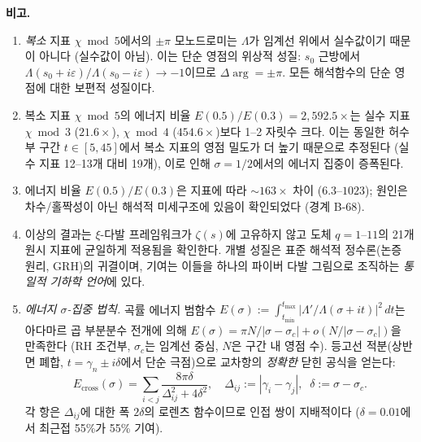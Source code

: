 \documentclass[11pt, a4paper]{article}
\theoremstyle{definition}
\theoremstyle{plain}
\begin{document}
\medskip\noindent\textbf{비고.}
\begin{enumerate}
\item \emph{복소} 지표 $\chi\bmod 5$에서의 $\pm\pi$ 모노드로미는 $\Lambda$가 임계선 위에서 실수값이기 때문이 아니다 (실수값이 아님). 이는 단순 영점의 위상적 성질: $s_0$ 근방에서 $\Lambda(s_0+i\varepsilon)/\Lambda(s_0-i\varepsilon) \to -1$이므로 $\Delta\arg = \pm\pi$. 모든 해석함수의 단순 영점에 대한 보편적 성질이다.
\item 복소 지표 $\chi\bmod 5$의 에너지 비율 $E(0.5)/E(0.3) = 2{,}592.5\times$는 실수 지표 $\chi\bmod 3$ ($21.6\times$), $\chi\bmod 4$ ($454.6\times$)보다 1--2 자릿수 크다. 이는 동일한 허수부 구간 $t\in[5,45]$에서 복소 지표의 영점 밀도가 더 높기 때문으로 추정된다 (실수 지표 12--13개 대비 19개), 이로 인해 $\sigma=1/2$에서의 에너지 집중이 증폭된다.
\item 에너지 비율 $E(0.5)/E(0.3)$은 지표에 따라 $\sim 163\times$ 차이 ($6.3$--$1023$);
  원인은 차수/홀짝성이 아닌 해석적 미세구조에 있음이 확인되었다 (경계 B-68).
\item 이상의 결과는 $\xi$-다발 프레임워크가 $\zeta(s)$에 고유하지 않고
  도체 $q = 1$--$11$의 21개 원시 지표에 균일하게 적용됨을 확인한다.
  개별 성질은 표준 해석적 정수론(논증 원리, GRH)의 귀결이며, 기여는 이들을 하나의 파이버 다발 그림으로 조직하는 \emph{통일적 기하학 언어}에 있다.
\item \emph{에너지 $\sigma$-집중 법칙.}\;
곡률 에너지 범함수
$E(\sigma):=\int_{t_{\min}}^{t_{\max}}|\Lambda'/\Lambda(\sigma+it)|^{2}\,dt$는
아다마르 곱 부분분수 전개에 의해
$E(\sigma)=\pi N/|\sigma-\sigma_c|+o(N/|\sigma-\sigma_c|)$을 만족한다
(RH 조건부, $\sigma_c$는 임계선 중심, $N$은 구간 내 영점 수).
등고선 적분(상반면 폐합, $t=\gamma_n\pm i\delta$에서 단순 극점)으로
교차항의 \emph{정확한} 닫힌 공식을 얻는다:
\begin{equation}\label{eq:cross_term_exact_ko}
  E_{\mathrm{cross}}(\sigma)
    = \sum_{i<j}\frac{8\pi\delta}{\Delta_{ij}^{2}+4\delta^{2}},
  \quad \Delta_{ij}:=|\gamma_i-\gamma_j|,\;\;
  \delta:=\sigma-\sigma_c.
\end{equation}
각 항은 $\Delta_{ij}$에 대한 폭 $2\delta$의 로렌츠 함수이므로
인접 쌍이 지배적이다 ($\delta=0.01$에서 최근접 55\%가 55\% 기여).


\end{enumerate}
\end{document}
